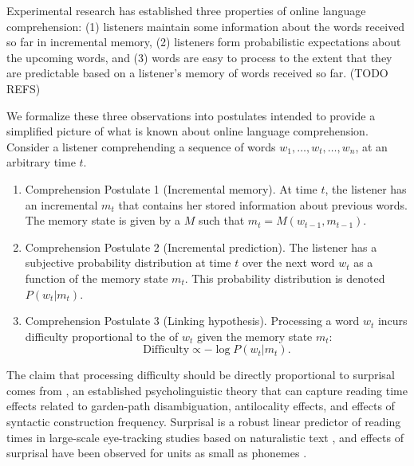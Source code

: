 Experimental research has established three properties of online language comprehension: (1) listeners maintain some information about the words received so far in incremental memory, (2) listeners form probabilistic expectations about the upcoming words, and (3) words are easy to process to the extent that they are predictable based on a listener's memory of words received so far. (TODO REFS)

We formalize these three observations into postulates intended to provide a simplified picture of what is known about online language comprehension. Consider a listener comprehending a sequence of words $w_1, \dots, w_t, \dots, w_n$, at an arbitrary time $t$.
\begin{enumerate}
    \item Comprehension Postulate 1 (Incremental memory). At time $t$, the listener has an incremental  $m_t$ that contains her stored information about previous words. The memory state is given by a  $M$ such that $m_t = M(w_{t-1}, m_{t-1})$.
    \item Comprehension Postulate 2 (Incremental prediction). The listener has a subjective probability distribution at time $t$ over the next word $w_t$ as a function of the memory state $m_t$. This probability distribution is denoted $P(w_t|m_t)$.
    \item Comprehension Postulate 3 (Linking hypothesis). Processing a word $w_t$ incurs difficulty proportional to the  of $w_t$ given the memory state $m_t$:
    \begin{equation}
    \label{eq:lossy-surp}
    \text{Difficulty} \propto -\log P(w_t | m_t).
\end{equation}
\end{enumerate}
The claim that processing difficulty should be directly proportional to surprisal comes from  \citep{hale2001probabilistic,levy2008expectation}, an established psycholinguistic theory that can capture reading time effects related to garden-path disambiguation, antilocality effects, and effects of syntactic construction frequency. Surprisal is a robust linear predictor of reading times in large-scale eye-tracking studies based on naturalistic text \citep{smith-effect-2013,goodkind-predictive-2018}, and effects of surprisal have been observed for units as small as phonemes \citep{}.

